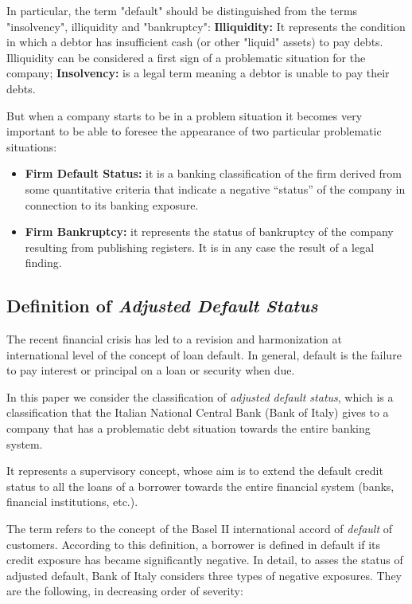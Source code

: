 In particular, the term "default" should be distinguished from the terms "insolvency", illiquidity and "bankruptcy": \textbf{Illiquidity:} It represents the condition in which a debtor has insufficient cash (or other "liquid"
assets) to pay debts. Illiquidity can be considered a first sign of a problematic situation for the company;  \textbf{Insolvency:} is a legal term meaning a debtor is unable to pay their debts.

But when a company starts to be in a problem situation it becomes very important to be able to foresee the appearance of two particular problematic situations:
\begin{itemize}
\item  \textbf{Firm Default Status:} it is a banking classification of the firm derived from some quantitative criteria that indicate a negative “status” of the company in connection to its banking exposure.
\item  \textbf{Firm Bankruptcy:} it represents the status of bankruptcy
of the company resulting from publishing registers. It is in any case the result of a legal finding.
\end{itemize}

 
\subsection{Definition of \emph{Adjusted Default Status}}
\label{subsec:adjusted-default}

The recent financial crisis has led to a revision and harmonization at
international level of the concept of loan default. In general, default
is the failure to pay interest or principal on a loan or security when
due.

In this paper we consider the classification of \emph{adjusted default
status}, which is a classification that the Italian National Central Bank (Bank of Italy) gives to a company that
has a problematic debt situation towards the entire banking system.

It represents a supervisory concept, whose aim is to extend the default credit status to all the loans of a borrower towards the entire financial system (banks, financial institutions, etc.).

The term refers to the concept of the Basel II international accord of
\emph{default} of customers.
According to this definition, a borrower is defined in default if its
credit exposure has became significantly negative.
In detail, to asses the status of adjusted default, Bank of Italy
considers three types of negative exposures. They are the following, in
decreasing order of severity:

